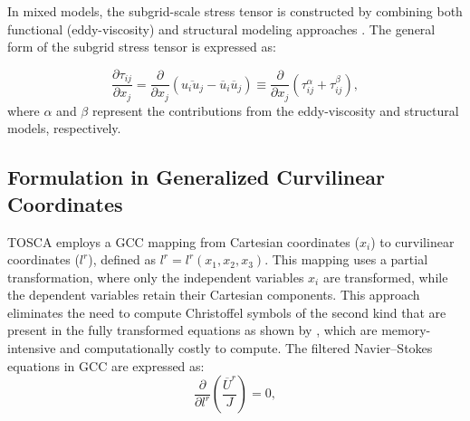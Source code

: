 \documentclass[final,3p]{elsarticle}
\begin{document}
In mixed models, the subgrid-scale stress tensor is constructed by combining both functional (eddy-viscosity) and structural modeling approaches \cite{streher2021mixed}. The general form of the subgrid stress tensor is expressed as: 

\begin{equation} 
	\frac{\partial\tau_{ij}}{\partial x_j} = \frac{\partial}{\partial x_j} \left(\overline{u_iu_j}-\overline{u}_i\overline{u}_j\right) \equiv \frac{\partial}{\partial x_j} \left(\tau_{ij}^{\alpha}+   \tau_{ij}^{\beta}\right), 
	\label{eq:contributionLES}
\end{equation} 
%
where $\alpha$ and $\beta$ represent the contributions from the eddy-viscosity and structural models, respectively. 

\subsection{Formulation in Generalized Curvilinear Coordinates}
TOSCA employs a GCC mapping from Cartesian coordinates ($x_i$) to curvilinear coordinates ($l^{r}$), defined as $l^{r} = l^{r}(x_1, x_2, x_3)$. This mapping uses a partial transformation, where only the independent variables $x_i$ are transformed, while the dependent variables retain their Cartesian components. This approach eliminates the need to compute Christoffel symbols of the second kind that are present in the fully transformed equations as shown by \citet{ge2007numerical}, which are memory-intensive and computationally costly to compute. The filtered Navier--Stokes equations in GCC are expressed as:
\begin{equation}
	\frac{\partial }{\partial l^{r}}\left(\frac{\overline{U}^r}{J} \right) = 0,
	\label{eq:genCONT}
\end{equation}
\end{document}
